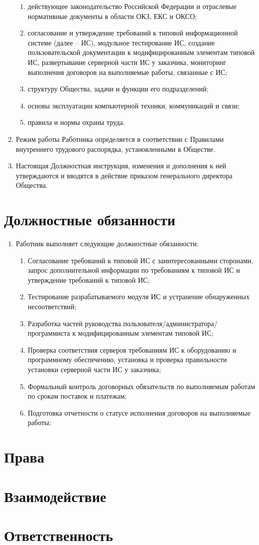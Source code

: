 \documentclass[a4paper, 12pt, twoside]{article}
\begin{document}
\begin{enumerate}[label=1.\arabic*.]
\begin{enumerate}[label=-]
    \item действующее законодательство Российской Федерации и отраслевые нормативные документы в области ОКЗ, ЕКС и ОКСО;
    \item согласование и утверждение требований к типовой информационной системе (далее – ИС), модульное тестирование ИС, создание пользовательской документации к модифицированным элементам типовой ИС, развертывание серверной части ИС у заказчика, мониторинг выполнения договоров на выполняемые работы, связанные с ИС;
    \item структуру Общества, задачи и функции его подразделений;
    \item основы эксплуатации компьютерной техники, коммуникаций и связи;
    \item правила и нормы охраны труда.
  \end{enumerate}
  \item Режим работы Работника определяется в соответствии с Правилами внутреннего трудового распорядка, установленными в Обществе.
  \item Настоящая Должностная инструкция, изменения и дополнения к ней утверждаются и вводятся в действие приказом генерального директора Общества.

\end{enumerate}

\section{Должностные обязанности}
\begin{enumerate}[label=2.\arabic*.]
  \item Работник выполняет следующие должностные обязанности:
  \begin{enumerate}[label=2.1.\arabic*.]
    \item Согласование требований к типовой ИС с заинтересованными сторонами, запрос дополнительной информации по требованиям к типовой ИС и утверждение требований к типовой ИС;
    \item Тестирование разрабатываемого модуля ИС и устранение обнаруженных несоответствий;
    \item Разработка частей руководства пользователя/администратора/программиста к модифицированным элементам типовой ИС;
    \item Проверка соответствия серверов требованиям ИС к оборудованию и программному обеспечению, установка и проверка правильности установки серверной части ИС у заказчика;
    \item Формальный контроль договорных обязательств по выполняемым работам по срокам поставок и платежам;
    \item Подготовка отчетности о статусе исполнения договоров на выполняемые работы; 
  \end{enumerate}
\end{enumerate}

\section{Права}
\section{Взаимодействие}
\section{Ответственность}
\end{document}
